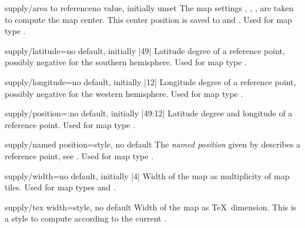 \begin{docMrcKey}{supply/area to reference}{}{no value, initially unset}
  The map settings
  , ,
  , 
  are taken to compute the map center. This center position is saved
  to  and .
  Used for map type .
\end{docMrcKey}



\begin{docMrcKey}{supply/latitude}{=}{no default, initially |49|}
  Latitude degree of a reference point, possibly negative for the southern hemisphere.
  Used for map type .
\end{docMrcKey}

\begin{docMrcKey}{supply/longitude}{=}{no default, initially |12|}
  Longitude degree of a reference point, possibly negative for the western hemisphere.
  Used for map type .
\end{docMrcKey}


\begin{docMrcKey}{supply/position}{=:}{no default, initially |49:12|}
  Latitude degree and longitude of a reference point.
  Used for map type .
\end{docMrcKey}


\begin{docMrcKey}{supply/named position}{=}{style, no default}
  The \emph{named position} given by  describes
  a reference point, see .
  Used for map type .
\end{docMrcKey}


\pagebreak
\begin{docMrcKey}{supply/width}{=}{no default, initially |4|}
  Width of the map as multiplicity of map tiles.
  Used for map types  and .
\end{docMrcKey}

\begin{docMrcKey}{supply/tex width}{=}{style, no default}
  Width of the map as \TeX\ dimension.
  This is a style to compute  according to
  the current .
\end{docMrcKey}

